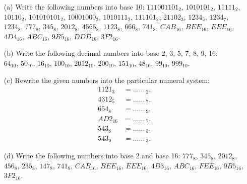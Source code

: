 \begin{exercise}\label{ex:numsyst3}
\begin{enumerate}
\item[(a)]
Write the following numbers into base 10: 
$111001101_2$, $1010101_2$, $11111_2$, $10110_2$, $101010101_2$, $10001000_2$, $1010111_2$, $111101_2$, 
$21102_3$, $1234_5$, $1234_7$, 
$1234_8$, $777_8$, $345_8$, $2012_8$, $4565_8$, $1123_8$, $666_8$, $741_8$, 
$CAB_{16}$, $BEE_{16}$, $EEE_{16}$, $4D4_{16}$, $ABC_{16}$, $9B5_{16}$, $DDD_{16}$, $3F2_{16}$. 

\item[(b)]
Write the following decimal numbers into base 2, 3, 5, 7, 8, 9, 16: \\
$64_{10}$, $50_{10}$, $16_{10}$, $100_{10}$, $2012_{10}$, $200_{10}$, $151_{10}$, $48_{10}$, $99_{10}$, $999_{10}$. 

\item[(c)]
Rewrite the given numbers into the particular numeral system: 
\begin{align*}
1121_3 &= \dots \dots \, _2, \\
4312_5 &= \dots \dots \, _7, \\
654_8 &= \dots \dots \, _9, \\
AD2_{16} &= \dots \dots \, _7, \\
543_8 &= \dots \dots \, _3, \\
543_9 &= \dots \dots \, _3. 
\end{align*}

\item[(d)]
Write the following numbers into base 2 and base 16: 
$777_8$, $345_8$, $2012_8$, $456_8$, $235_8$, $147_8$, $741_8$, 
$CAB_{16}$, $BEE_{16}$, $EEE_{16}$, $4D3_{16}$, $ABC_{16}$, $FEE_{16}$, $9B5_{16}$, $3F2_{16}$. 
\end{enumerate}
\end{exercise}

































